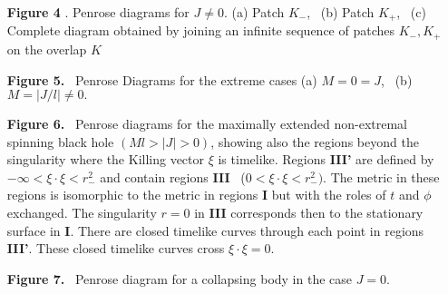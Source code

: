 \documentclass[12pt]{article}
\newcounter{c1} \newcounter{c2}
\begin{document}
\bigskip
\noindent
\begin{enumerate}
\item[{\bf Figure 4}]. Penrose diagrams for $J \not= 0$.
(a) Patch $K_-$, \ (b)
 Patch $K_+$, \ (c) Complete diagram obtained by joining an infinite
sequence of
 patches $K_-, K_+$ on the overlap $K$
\noindent
\item[{\bf Figure 5.}] \ Penrose Diagrams for the extreme cases (a)
$M=0=J$, \
 (b) $M= \vert J/l \vert \not= 0.$
\item[{\bf Figure 6.}] \ Penrose diagrams for the maximally extended
 non-extremal spinning black hole $(Ml > \vert J \vert > 0)$, showing also the
 regions beyond the singularity where the Killing vector $\xi$ is timelike.
 Regions {\bf III'} are defined by $- \infty < \xi \cdot \xi < r^2_-$ and
 contain regions {\bf III} \  ($0 < \xi \cdot \xi < r^2_-)$. The metric in
these
 regions is isomorphic to the metric in regions {\bf I} but with the roles of
 $t$ and $\phi$ exchanged. The singularity $r=0$ in {\bf III} corresponds then
 to the stationary surface in {\bf I}. There are closed timelike curves
through
each point in regions {\bf III'}. These closed timelike curves
cross $\xi\cdot\xi=0$.
\item[{\bf Figure 7.}]\ Penrose diagram for a collapsing body in the case
$J=0$.
\end{enumerate}
\end{document}
